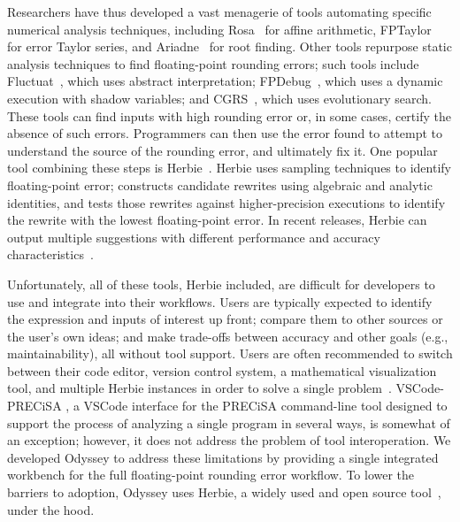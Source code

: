 Researchers have thus developed a vast menagerie of tools
  automating specific numerical analysis techniques,
  including Rosa~\cite{popl14-rosa} for affine arithmetic,
  FPTaylor~\cite{fm15-fptaylor} for error Taylor series, and
  Ariadne~\cite{popl13-ariadne} for root finding.
Other tools repurpose static analysis techniques
  to find floating-point rounding errors;
  such tools include Fluctuat~\cite{vmcai11-fluctuat},
  which uses abstract interpretation;
  FPDebug~\cite{pldi12-fpdebug},
  which uses a dynamic execution with shadow variables;
  and CGRS~\cite{ppopp14-cgrs}, which uses evolutionary search. 
These tools can find inputs with high rounding error
  or, in some cases, certify the absence of such errors.
Programmers can then use the error found
  to attempt to understand the source of the rounding error,
  and ultimately fix it.
One popular tool combining these steps is Herbie~\cite{herbie}.
Herbie uses sampling techniques to identify floating-point error;
  constructs candidate rewrites using algebraic and analytic identities,
  and tests those rewrites against higher-precision executions
  to identify the rewrite with the lowest floating-point error.
In recent releases, Herbie can output multiple suggestions
  with different performance and accuracy characteristics~\cite{pherbie}.

Unfortunately, all of these tools, Herbie included,
  are difficult for developers to use and integrate into their workflows.
Users are typically expected to
  identify the expression and inputs of interest up front;
  compare them to other sources or the user's own ideas;
  and make trade-offs between accuracy and other goals
  (e.g., maintainability),
  all without tool support.
Users are often recommended
  to switch between their code editor, version control system,
  a mathematical visualization tool, and multiple Herbie instances
  in order to solve a single problem~\cite{kneusel-numbers}.
VSCode-PRECiSA \cite{vscode-precisa}, 
  a VSCode interface for the PRECiSA 
  command-line tool \cite{precisa} designed to support the process 
  of analyzing a single program in several ways,
  is somewhat of an exception; 
  however, it does not address the problem of tool
  interoperation.
We developed Odyssey to address these limitations
  by providing a single integrated workbench
  for the full floating-point rounding error workflow.
To lower the barriers to adoption,
  Odyssey uses Herbie, a widely used and open source
  tool~\cite{herbieGithub,kneusel-numbers},
  under the hood. 


